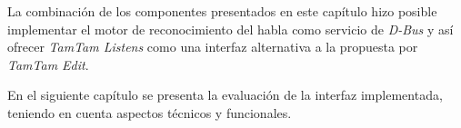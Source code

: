 La combinaci\'on de los componentes presentados en este cap\'itulo hizo posible implementar el motor 
de reconocimiento del habla como servicio de \emph{D-Bus} y as\'i ofrecer \emph{TamTam Listens} como una 
interfaz alternativa a la propuesta por \emph{TamTam Edit}.

En el siguiente cap\'itulo se presenta la evaluaci\'on de la interfaz implementada, teniendo en cuenta 
aspectos t\'ecnicos y funcionales.